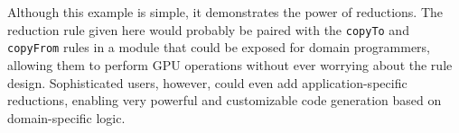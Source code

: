 Although this example is simple, it demonstrates the power of reductions. The
reduction rule given here would probably be paired with the \texttt{copyTo} and
\texttt{copyFrom} rules in a module that could be exposed for domain
programmers, allowing them to perform GPU operations without ever worrying about
the rule design. Sophisticated users, however, could even add
application-specific reductions, enabling very powerful and customizable code
generation based on domain-specific logic.
